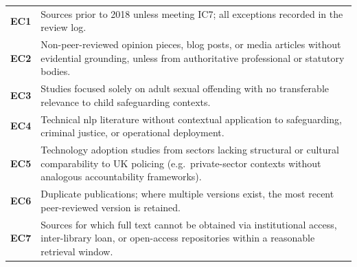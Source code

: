 \begingroup
\captionsetup{hypcap=false}
\label{tab:exclusion-criteria}
\endgroup
\begin{tcolorbox}[
  enhanced,
  breakable,
  colback=white,
  colframe=excred,
  title={\textbf{Exclusion Criteria}},
  fonttitle=\small\bfseries,
  coltitle=white,
  attach boxed title to top left={yshift=-2mm, xshift=6mm},
  boxed title style={colback=excred, colframe=excred},
  top=6pt, bottom=6pt, left=8pt, right=8pt,
  before upper={\small}
]
\setlength{\tabcolsep}{0pt}%
\begin{tabular}{%
  @{}%
  >{\bfseries\arraybackslash}p{0.9cm}%
  >{\arraybackslash}p{\dimexpr\tcbtextwidth-0.9cm\relax}%
  @{}%
}
EC1 & Sources prior to 2018 unless meeting IC7; all exceptions recorded in the review log. \\[3pt]
EC2 & Non-peer-reviewed opinion pieces, blog posts, or media articles without evidential grounding, unless from authoritative professional or statutory bodies. \\[3pt]
EC3 & Studies focused solely on adult sexual offending with no transferable relevance to child safeguarding contexts. \\[3pt]
EC4 & Technical \gls{nlp} literature without contextual application to safeguarding, criminal justice, or operational deployment. \\[3pt]
EC5 & Technology adoption studies from sectors lacking structural or cultural comparability to UK policing (e.g.\ private-sector contexts without analogous accountability frameworks). \\[3pt]
EC6 & Duplicate publications; where multiple versions exist, the most recent peer-reviewed version is retained. \\[3pt]
EC7 & Sources for which full text cannot be obtained via institutional access, inter-library loan, or open-access repositories within a reasonable retrieval window. \\
\end{tabular}
\end{tcolorbox}
